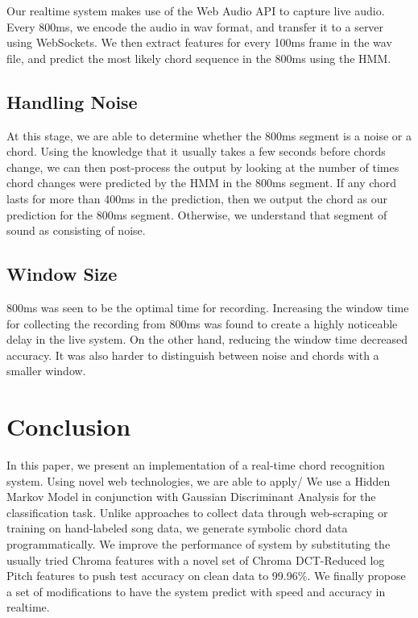 \documentclass{article}
\begin{document}
Our realtime system makes use of the Web Audio API to capture live audio. Every
800ms, we encode the audio in wav format, and transfer it to a server using
WebSockets. We then extract features for every 100ms frame in the wav file, and
predict the most likely chord sequence in the 800ms using the HMM.

\subsection{Handling Noise}
At this stage, we are able to determine whether the 800ms segment is a noise or
a chord. Using the knowledge that it usually takes a few seconds before chords
change, we can then post-process the output by looking at the number of times
chord changes were predicted by the HMM in the 800ms segment. If any chord lasts
for more than 400ms in the prediction, then we output the chord as our
prediction for the 800ms segment. Otherwise, we understand that segment of sound
as consisting of noise.

\subsection{Window Size}
800ms was seen to be the optimal time for recording. Increasing the window time
for collecting the recording from 800ms was found to create a highly noticeable
delay in the live system. On the other hand, reducing the window time decreased
accuracy. It was also harder to distinguish between noise and chords with a
smaller window.
\section{Conclusion}
In this paper, we present an implementation of a real-time chord recognition
system. Using novel web technologies, we are able to apply/ We use a Hidden
Markov Model in conjunction with Gaussian Discriminant Analysis for the
classification task. Unlike approaches to collect data through web-scraping or
training on hand-labeled song data, we generate symbolic chord data
programmatically. We improve the performance of system by substituting the
usually tried Chroma features with a novel set of Chroma DCT-Reduced log Pitch
features to push test accuracy on clean data to 99.96\%. We finally propose a
set of modifications to have the system predict with speed and accuracy in
realtime.



\end{document}
